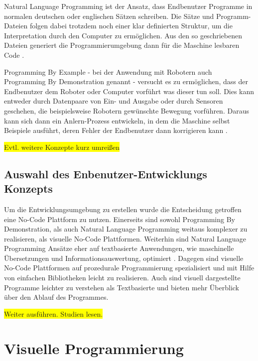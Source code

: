 Natural Language Programming ist der Ansatz, dass Endbenutzer Programme in normalen deutschen oder englischen Sätzen schreiben. Die Sätze und Programm-Dateien folgen dabei trotzdem noch einer klar definierten Struktur, um die Interpretation durch den Computer zu ermöglichen. Aus den so geschriebenen Dateien generiert die Programmierumgebung dann für die Maschine lesbaren Code \cite{Nadkarni2011NLPIntroduction}.

Programming By Example - bei der Anwendung mit Robotern auch Programming By Demonstration genannt - versucht es zu ermöglichen, dass der Endbenutzer dem Roboter oder Computer vorführt was dieser tun soll. Dies kann entweder durch Datenpaare von Ein- und Ausgabe \cite{Singh2015PredictionPBE} oder durch Sensoren geschehen, die beispielsweise Robotern gewünschte Bewegung vorführen. Daraus kann sich dann ein Anlern-Prozess entwickeln, in dem die Maschine selbst Beispiele ausführt, deren Fehler der Endbenutzer dann korrigieren kann \cite{Kurlander1993WatchPBD}.

\colorbox{yellow}{Evtl. weitere Konzepte kurz umreißen}

\subsection{Auswahl des Enbenutzer-Entwicklungs Konzepts}

Um die Entwicklungsumgebung zu erstellen wurde die Entscheidung getroffen eine No-Code Plattform zu nutzen. Einerseits sind sowohl Programming By Demonstration, als auch Natural Language Programming weitaus komplexer zu realisieren, als visuelle No-Code Plattformen. Weiterhin sind Natural Language Programming Ansätze eher auf textbasierte Anwendungen, wie maschinelle Übersetzungen und Informationsauswertung, optimiert \cite{Liddy2001NLP}. Dagegen sind visuelle No-Code Plattformen auf prozedurale Programmierung spezialisiert und mit Hilfe von einfachen Bibliotheken leicht zu realisieren. Auch sind visuell dargestellte Programme leichter zu verstehen als Textbasierte und bieten mehr Überblick über den Ablauf des Programmes. %

\colorbox{yellow}{Weiter ausführen. Studien lesen.}


\section{Visuelle Programmierung} \label{sec:visuelle-programmierung} %

